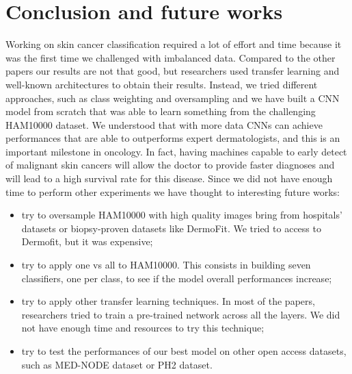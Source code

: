 \section{Conclusion and future works} \label{conclusion}
	
	Working on skin cancer classification required a lot of effort and time because it was the first time we challenged with imbalanced data. 
	Compared to the other papers our results are not that good, but researchers used transfer learning and well-known architectures to obtain their results. Instead, we tried different approaches, such as class weighting and oversampling and we have built a CNN model from scratch that was able to learn something from the challenging HAM10000 dataset. 
	We understood that with more data CNNs can achieve performances that are able to outperforms expert dermatologists, and this is an important milestone in oncology. In fact, having machines capable to early detect of malignant skin cancers will allow the doctor to provide faster diagnoses and will lead to a high survival rate for this disease. Since we did not have enough time to perform other experiments we have thought to interesting future works:

	\begin{itemize}
		\item try to oversample HAM10000 with high quality images bring from hospitals' datasets or biopsy-proven datasets like DermoFit\cite{dermofit}. We tried to access to Dermofit, but it was expensive;
		\item try to apply one vs all to HAM10000. This consists in building seven classifiers, one per class, to see if the model overall performances increase;
		\item try to apply other transfer learning techniques. In most of the papers, researchers tried to train a pre-trained network across all the layers. We did not have enough time and resources to try this technique;
		\item try to test the performances of our best model on other open access datasets, such as MED-NODE dataset\cite{mednode} or PH2 dataset. 	
	\end{itemize}
